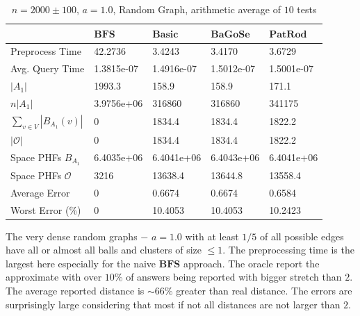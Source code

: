 \documentclass[shortabstract, lic, english]{iithesis}
\theoremstyle{definition} \newtheorem{definition}{Definition}[chapter]
\theoremstyle{plain} \newtheorem{remark}[definition]{Observation}
\theoremstyle{plain} \newtheorem{theorem}[definition]{Theorem}
\theoremstyle{plain} \newtheorem{lemma}[definition]{Lemma}
\theoremstyle{plain} \newtheorem{conjecture}[definition]{Conjecture}
\begin{document}
\begin{table}[H] \label{test:random.a10}
    \centering
    \begin{tabular}{ |p{3cm}||p{2cm}|p{2cm}|p{2cm}|p{2cm}|  } 
        \hline
        & $\mathbf{BFS}$ & $\mathbf{Basic}$ & $\mathbf{BaGoSe}$ & $\mathbf{PatRod}$ \\
        \hline
        \hline
        Preprocess Time                 & 42.2736    & 3.4243     & 3.4170      & 3.6729     \\
        \hline
        Avg. Query Time                 & 1.3815e-07 & 1.4916e-07 & 1.5012e-07  & 1.5001e-07 \\
        \hline
        $|A_1|$                         & 1993.3     & 158.9      & 158.9       & 171.1      \\
        \hline
        $n |A_1|$                       & 3.9756e+06 & 316860     & 316860      & 341175     \\
        \hline
        $\sum_{v \in V} |B_{A_1}(v)| $  & 0          & 1834.4     & 1834.4      & 1822.2     \\
        \hline
        $|\mathcal{O}|$                 & 0          & 1834.4     & 1834.4      & 1822.2     \\
        \hline
        Space PHFs $B_{A_1}$            & 6.4035e+06 & 6.4041e+06 & 6.4043e+06  & 6.4041e+06 \\
        \hline
        Space PHFs $\mathcal{O}$        & 3216       & 13638.4    & 13644.8     & 13558.4    \\
        \hline
        Average Error                   & 0          & 0.6674     & 0.6674      & 0.6584     \\
        \hline
        Worst Error (\%)                & 0          & 10.4053    & 10.4053     & 10.2423    \\
        \hline

    \end{tabular}
    \caption{$n = 2000 \pm 100$, $a = 1.0$, Random Graph, arithmetic average of $10$ tests}
\end{table}

The very dense random graphs $-$ $a=1.0$ with at least $1/5$ of all possible edges have all or almost all balls and clusters of size $\leq 1$.
The preprocessing time is the largest here especially for the naive $\mathbf{BFS}$ approach.
The oracle report the approximate with over $10\%$ of answers being reported with bigger stretch than $2$. The average reported distance is $\sim 66 \%$ greater than real distance.
The errors are surprisingly large considering that most if not all distances are not larger than $2$.
\end{document}
